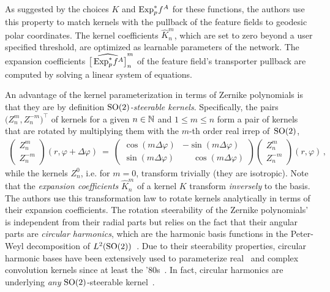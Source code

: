 As suggested by the choices $K$ and $\operatorname{Exp}^*_p\mkern-2mu f^A$ for these functions, the authors use this property to match kernels with the pullback of the feature fields to geodesic polar coordinates.
The kernel coefficients $\widehat{K}_n^m$, which are set to zero beyond a user specified threshold, are optimized as learnable parameters of the network.
The expansion coefficients $\widehat{\big[\operatorname{Exp}^*_p\mkern-2mu f^A\big]}_n^m$ of the feature field's transporter pullback are computed by solving a linear system of equations.

An advantage of the kernel parameterization in terms of Zernike polynomials is that they are by definition \emph{$\operatorname{SO}(2)$-steerable kernels}.
Specifically, the pairs $\big(Z_n^m, Z_n^{-m}\big)^\top$ of kernels for a given $n\in\mathbb{N}$ and $1\leq m\leq n$ form a pair of kernels that are rotated by multiplying them with the $m$-th order real irrep of~$\operatorname{SO}(2)$,
\begin{align}
    \begin{pmatrix}
        Z_n^m \\ Z_n^{-m}
    \end{pmatrix}
    (r,\varphi + \Delta\varphi)
    \ =\ 
    \begin{pmatrix}
        \cos(m\Delta\varphi) &          -  \sin(m\Delta\varphi) \\
        \sin(m\Delta\varphi) & \phantom{-} \cos(m\Delta\varphi)
    \end{pmatrix}
    \begin{pmatrix}
        Z_n^m \\ Z_n^{-m}
    \end{pmatrix}
    (r,\varphi) \,,
\end{align}
while the kernels $Z_n^0$, i.e. for $m=0$, transform trivially (they are isotropic).
Note that the \emph{expansion coefficients} $\widehat{K}_n^m$ of a kernel $K$ transform \emph{inversely} to the basis.
The authors use this transformation law to rotate kernels analytically in terms of their expansion coefficients.
The rotation steerability of the Zernike polynomials' is independent from their radial parts but relies on the fact that their angular parts are \emph{circular harmonics}, which are the harmonic basis functions in the Peter-Weyl decomposition of $L^2(\operatorname{SO}(2))$~\cite{lang2020WignerEckart}.
Due to their steerability properties, circular harmonic bases have been extensively used to parameterize real~\cite{Weiler2018SFCNN,graham2020dense} and complex~\cite{Worrall2017-HNET,Wiersma2020} convolution kernels since at least the '80s~\cite{Hsu1982optical,Rosen1988circularHarmonic,freeman1991design,hel1998canonical}.
In fact, circular harmonics are underlying \emph{any} $\operatorname{SO}(2)$-steerable kernel~\cite{Weiler2019_E2CNN,lang2020WignerEckart}.

